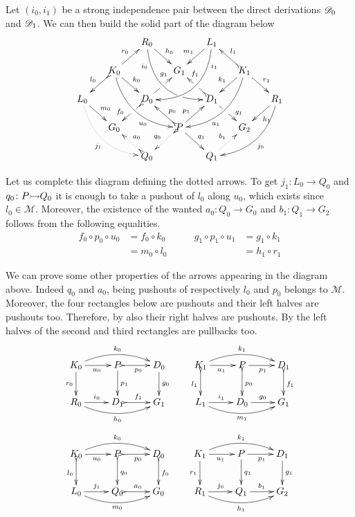 \begin{remark}\label{rem:deco} 
	Let $(i_0, i_1)$ be a strong
	independence pair between the direct derivations $\mathscr{D}_0$ and
	$\mathscr{D}_1$. We can then build the solid part of the diagram
	below
	\[\xymatrix@C=15pt@R=15pt{&&R_0 \ar@/_.8cm/[ddrr]_(.2){i_0}|(.7)\hole
		\ar[dr]^{h_0}&& L_1\ar@/^.8cm/[ddll]^(.2){i_1}
		\ar[dl]_{m_1}\\&K_0\ar[dr]^{k_0}\ar@{>->}[dl]_{l_0}
		\ar@/_.6cm/[ddrr]_(.65){u_0}\ar[ur]^{r_0}&& G_1 && K_1
		\ar@/^.6cm/[ddll]^(.65){u_1}\ar[dl]_{k_1}\ar@{>->}[lu]_{l_1}
		\ar[dr]^{r_1}\\L_0 \ar[dr]^{m_0}
		\ar@{.>}@/_.6cm/[ddrr]_{j_1}&& D_0
		\ar@{>->}[dl]|(.42)\hole_(.64){f_0}\ar[ur]|(.48)\hole^(.7){g_1}&&D_1
		\ar[dr]|(.42)\hole^(.65){g_1}
		\ar@{>->}[ul]|(.48)\hole_(.7){f_1}&&R_1\ar@/^.6cm/[ddll]^{j_0}\ar[dl]^{h_1}\\&G_0
		&&P\ar[dr]^{q_1}
		\ar@{>.>}[dl]_{q_0}\ar[ur]^(.4){p_1}\ar@{>->}[ul]_(.4){p_0}&&G_2\\&&Q_0
		\ar@{>->}@{>.>}[ul]_{a_0} &&Q_1\ar@{.>}[ur]^{b_1}}
	\]
	
	Let us complete this diagram defining the dotted arrows. To get
	$j_1\colon L_0\to Q_0$ and $q_0\colon P\mto Q_0$ it is enough to
	take a pushout of $l_0$ along $u_0$, which exists since
	$l_0\in \mathcal{M}$. Moreover, the existence of the wanted
	$a_0\colon Q_0\to G_0$ and $b_1\colon Q_1\to G_2$ follows from the following equalities.
	\[\begin{split}
	f_0\circ p_0 \circ u_0 &= f_0\circ k_0 \\&= m_0\circ l_0
	\end{split}
	 \qquad\begin{split}
	 	g_1\circ p_1\circ u_1 &= g_1\circ k_1\\&=h_1\circ r_1
	 \end{split}
	\]
	
	We can prove some other properties of
		the arrows appearing in the diagram above. Indeed $q_0$ and $a_0$, being pushouts of
		respectively $l_0$ and $p_0$ belongs to
		$\mathcal{M}$. Moreover, the four rectangles
		below are pushouts and their left halves are pushouts
		too. Therefore, by  also their right halves are
		pushouts. By  the left halves of the
		second and third rectangles are pullbacks too. 
		\[\xymatrix{K_0 \ar@/^.4cm/[rr]^{k_0}\ar[d]_{r_0}\ar[r]_{u_0}
			&P\ar[d]^{p_1} \ar@{>->}[r]_{p_0} & D_0 \ar[d]^{g_0}&K_1
			\ar@/^.4cm/[rr]^{k_1}\ar@{>->}[d]_{l_1}\ar[r]_{u_1}
			&P\ar@{>->}[d]^{p_0} \ar[r]_{p_1} & D_1 \ar@{>->}[d]^{f_1}\\
			R_0 \ar@/_.4cm/[rr]_{h_0} \ar[r]^{i_0}&D_1 \ar@{>->}[r]^{f_1}
			& G_1&L_1 \ar@/_.4cm/[rr]_{m_1} \ar[r]^{i_1}&D_0\ar[r]^{g_0} &
			G_1}\]
			\[\xymatrix{K_0
			\ar@/^.4cm/[rr]^{k_0}\ar@{>->}[d]_{l_0}\ar[r]_{u_0}
			&P\ar@{>->}[d]^{q_0} \ar@{>->}[r]_{p_0} & D_0
			\ar@{>->}[d]^{f_0}&K_1
			\ar@/^.4cm/[rr]^{k_1}\ar[d]_{r_1}\ar[r]_{u_1}
			&P\ar[d]^{q_1} \ar[r]_{p_1} & D_1 \ar[d]^{g_1}\\
			L_0 \ar@/_.4cm/[rr]_{m_0} \ar[r]^{j_1}&Q_0 \ar@{>->}[r]^{a_0}
			& G_0&R_1 \ar@/_.4cm/[rr]_{h_1} \ar[r]^{j_0}&Q_1 \ar[r]^{b_1}
			& G_2}\]
\end{remark}

